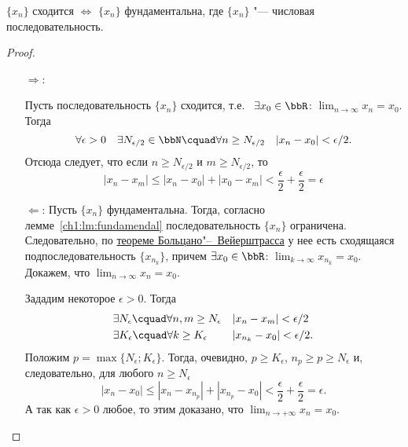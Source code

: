 \begin{thm} 
$\{x_n\}$ сходится $\Longleftrightarrow$ $\{x_n\}$ фундаментальна, где $\{x_n\}$ "--- числовая последовательность.
\end{thm}
\begin{proof}\leavevmode
\begin{itemize}[wide, labelwidth=!, labelindent=0pt]
\item[$\Longrightarrow$:]

Пусть последовательность $\{x_n\}$ сходится, т.е.~ $\exists x_{0} \in \bbR$:  $\lim_{n \to \infty}\limits x_n = x_0$. Тогда 
$$
\forall \epsilon > 0\quad \exists N_{\epsilon/2} \in \bbN\cquad \forall n \ge N_{\epsilon/2}\quad |x_n-x_0|<\epsilon/2.
$$
Отсюда следует, что если $n \ge N_{\epsilon/2}$ и $m \ge N_{\epsilon/2}$, то
$$
|x_n-x_m| \le |x_n-x_0|+|x_0-x_m| <\frac{\epsilon}{2}+\frac{\epsilon}{2}=\epsilon
$$

\item[$\Longleftarrow$:]
Пусть $\{x_n\}$ фундаментальна. Тогда, согласно лемме~\ref{ch1:lm:fundamendal} последовательность $\{x_n\}$ ограничена. Следовательно, по \hyperref[ch1:th:TBV]{теореме Больцано"--~Вейерштрасса} у нее есть сходящаяся подпоследовательность $\{x_{n_k}\}$, причем $\exists x_0 \in \bbR$: $\lim_{k \to \infty}\limits x_{n_k} =x_0 $. Докажем, что $\lim_{n \to \infty}\limits x_{n}=x_0 $.

Зададим некоторое $\epsilon > 0$. Тогда
\begin{gather*}
\begin{aligned}
& \exists N_\epsilon\cquad \forall n,m \ge N_\epsilon &&|x_n-x_m|<\epsilon/2\\
& \exists K_\epsilon\cquad \forall k \ge K_\epsilon   &&|x_{n_k}-x_0|<\epsilon/2.
\end{aligned}
\end{gather*}
Положим $p=\max\{N_\epsilon;K_\epsilon\}$. Тогда, очевидно, $p \ge K_\epsilon$, $n_p \ge p \ge N_\epsilon$ и, следовательно, для любого $n \ge N_\epsilon$
$$
|x_n-x_0| \le |x_n-x_{n_p}|+|x_{n_p}-x_0|<\frac{\epsilon}{2}+\frac{\epsilon}{2}=\epsilon.
$$
А так как $\epsilon > 0$ любое, то этим доказано, что $\lim_{n \to +\infty}\limits x_n = x_0$. \qedhere
\end{itemize}
\end{proof}
